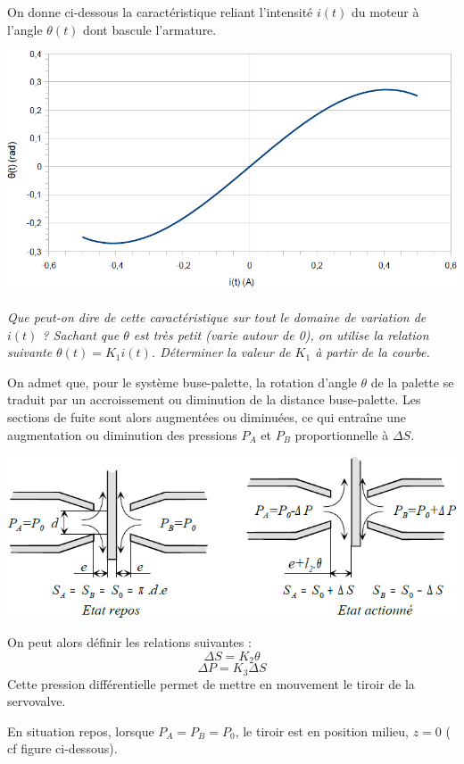 \documentclass[10pt,oneside]{article}
\begin{document}
On donne ci-dessous la caractéristique reliant l'intensité $i(t)$ du moteur à l'angle $\theta(t)$ dont bascule
l'armature.

\begin{center}
\includegraphics[width=.8\textwidth]{png/image8.png}
\end{center}

\paragraph{}
\textit{Que peut-on dire de cette caractéristique sur tout le domaine de variation de $i(t)$ ? Sachant
que $\theta$ est très petit (varie autour de 0), on utilise la relation suivante $\theta(t)=K_1i(t)$.
 Déterminer la valeur de $K_1$ à partir de la courbe.}

On admet que, pour le système buse-palette, la rotation d'angle $\theta$ de la palette se traduit par un
accroissement ou diminution de la distance buse-palette. Les sections de fuite sont alors augmentées ou
diminuées, ce qui entraîne une augmentation ou diminution des pressions $P_A$ et $P_B$ proportionnelle à
$\Delta S$.

\begin{center}
\includegraphics[width=.8\textwidth]{png/image9.png}
\end{center}

On peut alors définir les relations suivantes :
$$\Delta S=K_2 \theta$$
$$\Delta P=K_3 \Delta S$$
Cette pression différentielle permet de mettre en mouvement le tiroir de la servovalve.

En situation repos, lorsque $P_A=P_B=P_0$, le tiroir est en position milieu, $z = 0$ ( cf figure ci-dessous).
\end{document}
